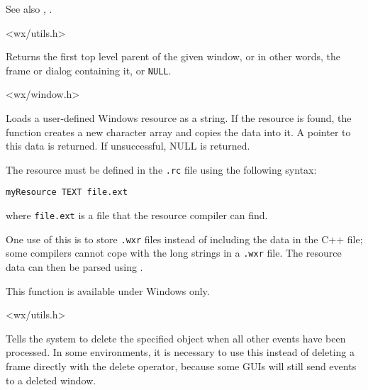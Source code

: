 See also , .


<wx/utils.h>

\label{wxgettoplevelparent}


Returns the first top level parent of the given window, or in other words, the
frame or dialog containing it, or {\tt NULL}.


<wx/window.h>

\label{wxloaduserresource}


Loads a user-defined Windows resource as a string. If the resource is found, the function creates
a new character array and copies the data into it. A pointer to this data is returned. If unsuccessful, NULL is returned.

The resource must be defined in the {\tt .rc} file using the following syntax:

\begin{verbatim}
myResource TEXT file.ext
\end{verbatim}

where {\tt file.ext} is a file that the resource compiler can find.

One use of this is to store {\tt .wxr} files instead of including the data in the C++ file; some compilers
cannot cope with the long strings in a {\tt .wxr} file. The resource data can then be parsed
using .

This function is available under Windows only.


<wx/utils.h>

\label{wxpostdelete}


Tells the system to delete the specified object when
all other events have been processed. In some environments, it is
necessary to use this instead of deleting a frame directly with the
delete operator, because some GUIs will still send events to a deleted window.


